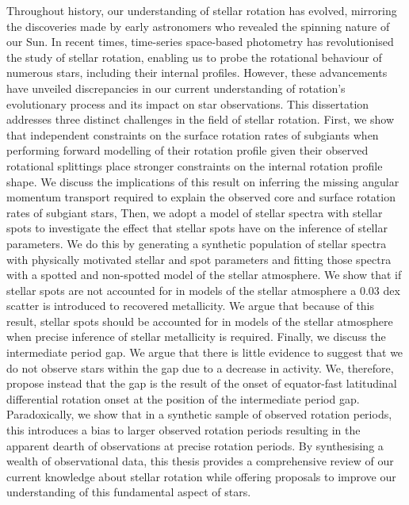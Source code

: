 {Throughout history, our understanding of stellar rotation has evolved, mirroring the discoveries made by early astronomers who revealed the spinning nature of our Sun. 
In recent times, time-series space-based photometry has revolutionised the study of stellar rotation, enabling us to probe the rotational behaviour of numerous stars, including their internal profiles. 
However, these advancements have unveiled discrepancies in our current understanding of rotation's evolutionary process and its impact on star observations.
This dissertation addresses three distinct challenges in the field of stellar rotation. 
First, we show that independent constraints on the surface rotation rates of subgiants when performing forward modelling of their rotation profile given their observed rotational splittings place stronger constraints on the internal rotation profile shape. We discuss the implications of this result on inferring the missing angular momentum transport required to explain the observed core and surface rotation rates of subgiant stars,
Then, we adopt a model of stellar spectra with stellar spots to investigate the effect that stellar spots have on the inference of stellar parameters. We do this by generating a synthetic population of stellar spectra with physically motivated stellar and spot parameters and fitting those spectra with a spotted and non-spotted model of the stellar atmosphere. We show that if stellar spots are not accounted for in models of the stellar atmosphere a 0.03 dex scatter is introduced to recovered metallicity. We argue that because of this result, stellar spots should be accounted for in models of the stellar atmosphere when precise inference of stellar metallicity is required.
Finally, we discuss the intermediate period gap. We argue that there is little evidence to suggest that we do not observe stars within the gap due to a decrease in activity. We, therefore, propose instead that the gap is the result of the onset of equator-fast latitudinal differential rotation onset at the position of the intermediate period gap. Paradoxically, we show that in a synthetic sample of observed rotation periods, this introduces a bias to larger observed rotation periods resulting in the apparent dearth of observations at precise rotation periods.
By synthesising a wealth of observational data, this thesis provides a comprehensive review of our current knowledge about stellar rotation while offering proposals to improve our understanding of this fundamental aspect of stars.
}


